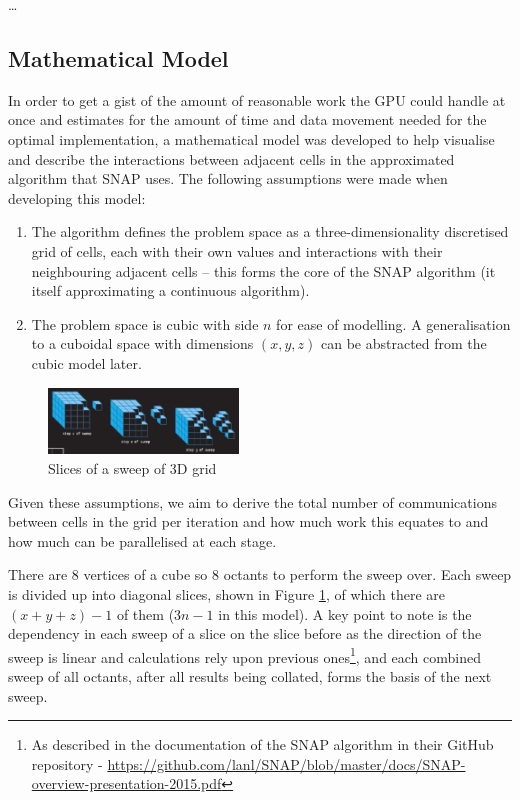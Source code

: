 \documentclass[conference]{IEEEtran}
\begin{document}
\dots


\subsection{Mathematical Model}

In order to get a gist of the amount of reasonable work the GPU could handle at once and estimates for the amount of time and data movement needed for the optimal implementation, a mathematical model was developed to help visualise and describe the interactions between adjacent cells in the approximated algorithm that SNAP uses. The following assumptions were made when developing this model:

\begin{enumerate}

\item The algorithm defines the problem space as a three-dimensionality discretised grid of cells, each with their own values and interactions with their neighbouring adjacent cells – this forms the core of the SNAP algorithm (it itself approximating a continuous algorithm).

\item The problem space is cubic with side $ n $ for ease of modelling. A generalisation to a cuboidal space with dimensions $ (x, y, z) $ can be abstracted from the cubic model later.

\end{enumerate}

\begin{figure}[h!]
\centering
\includegraphics[width=0.45\textwidth]{images/Sweep.jpg}
\caption{Slices of a sweep of 3D grid}
\label{fig:3dsweepslice}
\end{figure}

Given these assumptions, we aim to derive the total number of communications between cells in the grid per iteration and how much work this equates to and how much can be parallelised at each stage.

There are $ 8 $ vertices of a cube so $ 8 $ octants to perform the sweep over. Each sweep is divided up into diagonal slices, shown in Figure \ref{fig:3dsweepslice}, of which there are $ (x + y + z) - 1 $ of them ($ 3n - 1 $ in this model). A key point to note is the dependency in each sweep of a slice on the slice before as the direction of the sweep is linear and calculations rely upon previous ones\footnote{As described in the documentation of the SNAP algorithm in their GitHub repository - \url{ https://github.com/lanl/SNAP/blob/master/docs/SNAP-overview-presentation-2015.pdf}}, and each combined sweep of all octants, after all results being collated, forms the basis of the next sweep.
\end{document}
